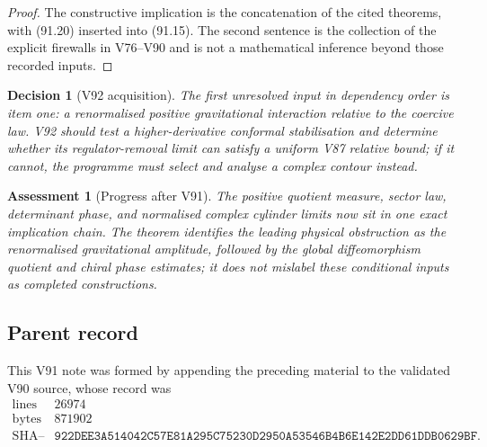 \documentclass[11pt]{article}
\newtheorem{assessment}[theorem]{Assessment}
\newtheorem{decision}[theorem]{Decision}
\begin{document}
\begin{proof}
The constructive implication is the concatenation of the cited
theorems, with (91.20) inserted into (91.15).  The second sentence is
the collection of the explicit firewalls in V76--V90 and is not a
mathematical inference beyond those recorded inputs.
\end{proof}

\begin{decision}[V92 acquisition]
\label{dec:v11v91-next}
The first unresolved input in dependency order is item one: a
renormalised positive gravitational interaction relative to the
coercive law.  V92 should test a higher-derivative conformal
stabilisation and determine whether its regulator-removal limit can
satisfy a uniform V87 relative bound; if it cannot, the programme
must select and analyse a complex contour instead.
\end{decision}

\begin{assessment}[Progress after V91]
\label{ass:v11v91-status}
The positive quotient measure, sector law, determinant phase, and
normalised complex cylinder limits now sit in one exact implication
chain.  The theorem identifies the leading physical obstruction as
the renormalised gravitational amplitude, followed by the global
diffeomorphism quotient and chiral phase estimates; it does not
mislabel these conditional inputs as completed constructions.
\end{assessment}

\subsection{Parent record}

This V91 note was formed by appending the preceding material to the
validated V90 source, whose record was
\[
\begin{array}{c|c}
\text{lines}&26974\\
\text{bytes}&871902\\
\text{SHA--256}&
\texttt{922DEE3A514042C57E81A295C75230D2950A53546B4B6E142E2DD61DDB0629BF}.
\end{array}                                                     \tag{91.26}
\]

\end{document}
